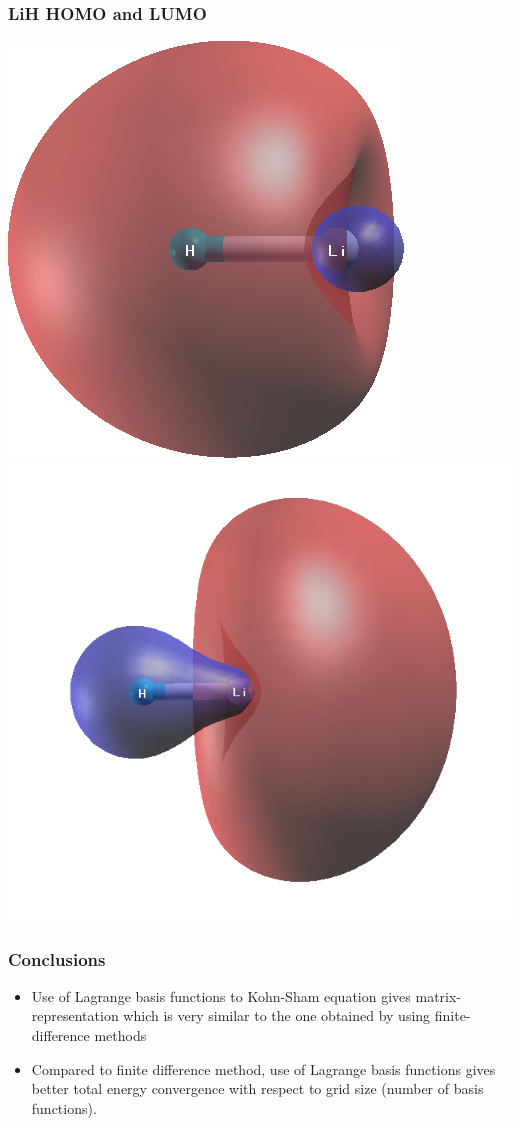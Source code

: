 \documentclass[10pt,t]{beamer}
\begin{document}
\begin{frame}
\frametitle{LiH HOMO and LUMO}

{\centering
\includegraphics[scale=0.25]{images/LiH_HOMO.png}
\includegraphics[scale=0.25]{images/LiH_LUMO.png}
\par}

\end{frame}

\begin{frame}[t]
\frametitle{Conclusions}

\begin{itemize}
\item Use of Lagrange basis functions to Kohn-Sham equation gives
matrix-representation which is very similar to the one obtained by
using finite-difference methods
\item Compared to finite difference method, use of Lagrange basis functions
gives better total energy convergence with respect to grid size (number of basis
functions).
\end{itemize}

\end{frame}
\end{document}

